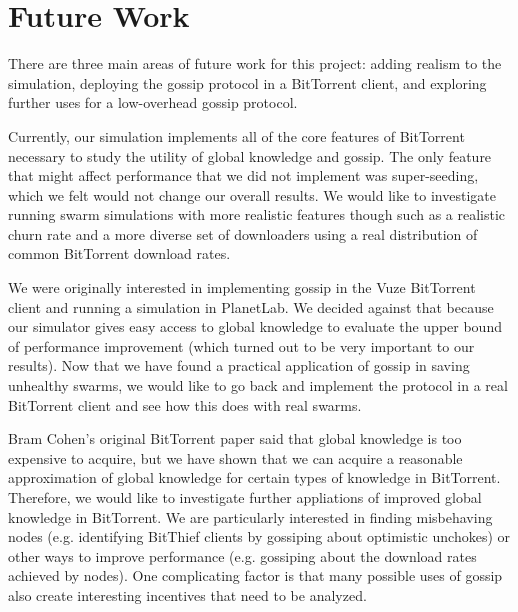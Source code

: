 \section{Future Work}

There are three main areas of future work for this project: adding realism 
to the simulation, deploying the gossip protocol in a BitTorrent client,
and exploring further uses for a low-overhead gossip protocol. 

Currently, our simulation implements all of the core features of
BitTorrent necessary to study the utility of global knowledge and
gossip. The only feature that might affect performance that we did not
implement was super-seeding, which we felt would not change our overall
results. We would like to investigate running swarm simulations with
more realistic features though such as a realistic churn rate and a more
diverse set of downloaders using a real distribution of common BitTorrent
download rates.

We were originally interested in implementing gossip in the Vuze BitTorrent client
and running a simulation in PlanetLab. We decided against that because our simulator
gives easy access to global knowledge to evaluate the upper bound of performance improvement
(which turned out to be very important to our results). Now that we have found a practical
application of gossip in saving unhealthy swarms, we would like to go back and implement
the protocol in a real BitTorrent client and see how this does with real swarms.


Bram Cohen's original BitTorrent paper said that global knowledge is too expensive to acquire,
but we have shown that we can acquire a reasonable approximation of global knowledge
for certain types of knowledge in BitTorrent. Therefore, we would like to investigate
further appliations of improved global knowledge in BitTorrent. We are particularly interested in 
finding misbehaving nodes (e.g. identifying BitThief clients by gossiping about optimistic unchokes)
or other ways to improve performance (e.g. gossiping about the download rates achieved by nodes).
One complicating factor is that many possible uses of gossip also create interesting incentives
that need to be analyzed.

